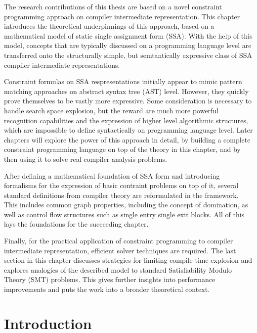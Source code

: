 
    The research contributions of this thesis are based on a novel constraint
    programming approach on compiler intermediate representation.
    This chapter introduces the theoretical underpinnings of this approach,
    based on a mathematical model of static single assignment form (SSA).
    With the help of this model, concepts that are typically discussed on a
    programming language level are transferred onto the structurally simple,
    but semtantically expressive class of SSA compiler intermediate
    representations.

    Constraint formulas on SSA respresentations initially appear to mimic
    pattern matching approaches on abstract syntax tree (AST) level.
    However, they quickly prove themselves to be vastly more expressive.
    Some consideration is necessary to handle search space explosion, but
    the reward are much more powerful recognition capabilities and the
    expression of higher level algorithmic structures, which are impossible to
    define syntactically on programming language level.
    Later chapters will explore the power of this approach in detail, by
    building a complete constraint programming language on top of the theory in
    this chapter, and by then using it to solve real compiler analysis problems.

    After defining a mathematical foundation of SSA form and introducing
    formalisms for the expression of basic contraint problems on top of it,
    several standard definitions from compiler theory are reformulated in the
    framework.
    This includes common graph properties, including the concept of domination,
    as well as control flow structures such as single entry single exit blocks.
    All of this lays the foundations for the succeeding chapter.

    Finally, for the practical application of constraint programming to compiler
    intermediate representation, efficient solver techniques are required.
    The last section in this chapter discusses strategies for limiting
    compile time explosion and explores analogies of the described model to
    standard Satisfiability Modulo Theory (SMT) problems.
    This gives further insights into performance improvements and puts the
    work into a broader theoretical context.

\section{Introduction}

